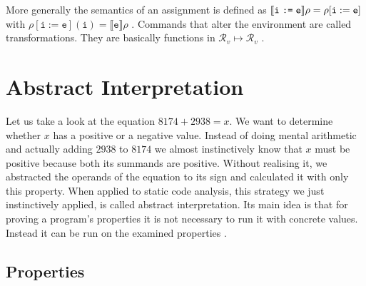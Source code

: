 \documentclass{report}
\begin{document}
More generally the semantics of an assignment is defined as $\llbracket \texttt{i\;:=\;e} \rrbracket\rho=\rho[\mathtt{i}:=\texttt{e}]$ with $\rho[\mathtt{i}:=\texttt{e}](\mathtt{i})=\llbracket\mathtt{e}\rrbracket\rho$ \cite{cousot2011}. Commands that alter the environment are called transformations. They are basically functions in $\mathcal{R}_v\mapsto\mathcal{R}_v$ \cite{scott1971}.


\section{Abstract Interpretation}

Let us take a look at the equation $8174+2938=x$. We want to determine whether $x$ has a positive or a negative value. Instead of doing mental arithmetic and actually adding $2938$ to $8174$ we almost instinctively know that $x$ must be positive because both its summands are positive. Without realising it, we abstracted the operands of the equation to its sign and calculated it with only this property. When applied to static code analysis, this strategy we just instinctively applied, is called abstract interpretation. Its main idea is that for proving a program's properties it is not necessary to run it with concrete values. Instead it can be run on the examined properties \cite{cousot2023, cousot1977}.


\subsection{Properties}
\end{document}
